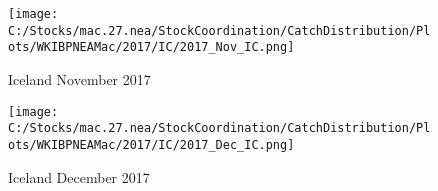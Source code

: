 \documentclass{article}
\begin{document}
\begin{figure}
	\centering
		\texttt{[image: C:/Stocks/mac.27.nea/StockCoordination/CatchDistribution/Plots/WKIBPNEAMac/2017/IC/2017\_Nov\_IC.png]}
	\caption{Iceland November 2017}
	\label{fig:2017_Nov_IC}
\end{figure}

\begin{figure}
	\centering
		\texttt{[image: C:/Stocks/mac.27.nea/StockCoordination/CatchDistribution/Plots/WKIBPNEAMac/2017/IC/2017\_Dec\_IC.png]}
	\caption{Iceland December 2017}
	\label{fig:2017_Dec_IC}
\end{figure}
\end{document}
